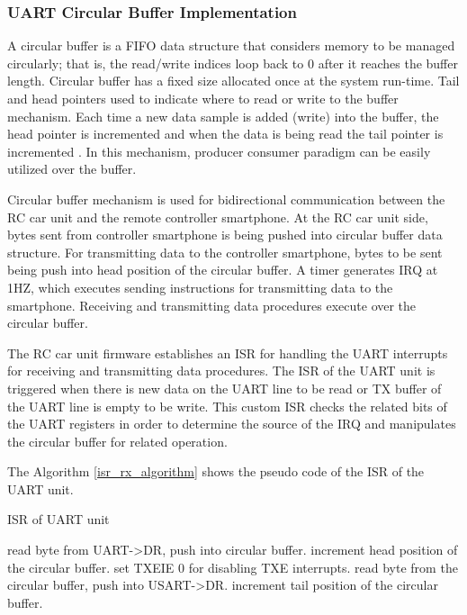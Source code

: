 \subsubsection{UART Circular Buffer Implementation}
\label{sec_uart_circular_buff}

A circular buffer is a FIFO data structure that considers memory to be managed circularly; that is, the read/write indices loop back to 0 after it reaches the buffer length. Circular buffer has a fixed size allocated once at the system run-time. Tail and head pointers used to indicate where to read or write to the buffer mechanism. Each time a new data sample is added (write) into the buffer, the head pointer is incremented and when the data is being read the tail pointer is incremented \cite{Ref_circ-buffer} \cite{Ref_circ_buffer_paper}. In this mechanism, producer consumer paradigm can be easily utilized over the buffer.

Circular buffer mechanism is used for bidirectional communication between the RC car unit and the remote controller smartphone. At the RC car unit side, bytes sent from controller smartphone is being pushed into circular buffer data structure. For transmitting data to the controller smartphone, bytes to be sent being push into head position of the circular buffer. A timer generates IRQ at 1HZ, which executes sending instructions for transmitting data to the smartphone. Receiving and transmitting data procedures execute over the circular buffer.

The RC car unit firmware establishes an ISR for handling the UART interrupts for receiving and transmitting data procedures. The ISR of the UART unit is triggered when there is new data on the UART line to be read or TX buffer of the UART line is empty to be write. This custom ISR checks the related bits of the UART registers in order to determine the source of the IRQ and manipulates the circular buffer for related operation.

The Algorithm \ref{isr_rx_algorithm} shows the pseudo code of the ISR of the UART unit.

\begin{algorithm}
\caption{ISR of UART unit}
\label{isr_rx_algorithm}
    \begin{algorithmic}
        \State read byte from UART->DR, push into circular buffer.
        \State increment head position of the circular buffer.
    \EndIf
            \State set TXEIE 0 for disabling TXE interrupts.
            \State read byte from the circular buffer, push into USART->DR.
            \State increment tail position of the circular buffer.
        \EndIf
    \EndIf
    \end{algorithmic}
\end{algorithm}

